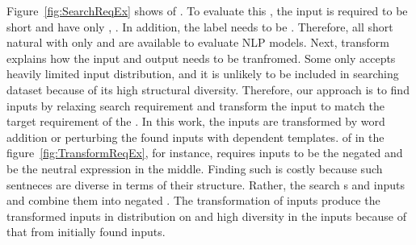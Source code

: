 \begin{figure}[t]
  
  \vspace{-10pt}
  \caption{\SearchRequirementExampleFigCaption}
  \vspace{-10pt}
\end{figure}

\begin{figure}[t]
  
  \vspace{-10pt}
  \caption{\TransformRequirementExampleFigCaption}
  \vspace{-10pt}
\end{figure}

Figure~\ref{fig:SearchReqEx} shows \lc of \SareqExOne. To evaluate
this \lc, the input is required to be short and have only \neu \adjs,
\neu \nns. In addition, the label needs to be \neu. Therefore, all
short natural \sents with only \neu \adjs and \neu \nns are available
to evaluate NLP models. Next, transform \req explains how the input
and output needs to be tranfromed. Some \lc only accepts heavily
limited input distribution, and it is unlikely to be included in
searching dataset because of its high structural diversity. Therefore,
our approach is to find inputs by relaxing search requirement and
transform the input to match the target requirement of the \lc. In
this work, the inputs are transformed by word addition or perturbing
the found inputs with \lc dependent templates. \Lc of \SareqExTwo in
the figure~\ref{fig:TransformReqEx}, for instance, requires inputs to
be the negated \pstv \sents and be the neutral expression in the
middle. Finding such \sents is costly because such sentneces are
diverse in terms of their structure. Rather, the \Model search \pstv s
and \neu inputs and combine them into negated \pstv \sents. The
transformation of inputs produce the transformed inputs in
distribution on \lc and high diversity in the inputs because of that
from initially found inputs.
